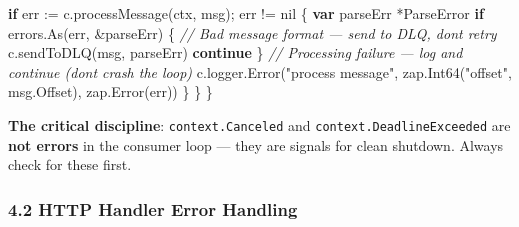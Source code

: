 \documentclass[
]{article}
\newenvironment{Shaded}{}{}
\newcommand{\CommentTok}[1]{\textcolor[rgb]{0.38,0.63,0.69}{\textit{#1}}}
\newcommand{\ControlFlowTok}[1]{\textcolor[rgb]{0.00,0.44,0.13}{\textbf{#1}}}
\newcommand{\KeywordTok}[1]{\textcolor[rgb]{0.00,0.44,0.13}{\textbf{#1}}}
\newcommand{\NormalTok}[1]{#1}
\newcommand{\OperatorTok}[1]{\textcolor[rgb]{0.40,0.40,0.40}{#1}}
\newcommand{\OtherTok}[1]{\textcolor[rgb]{0.00,0.44,0.13}{#1}}
\newcommand{\StringTok}[1]{\textcolor[rgb]{0.25,0.44,0.63}{#1}}
\begin{document}
\begin{Shaded}
\begin{Highlighting}[]
        \ControlFlowTok{if}\NormalTok{ err }\OperatorTok{:=}\NormalTok{ c}\OperatorTok{.}\NormalTok{processMessage}\OperatorTok{(}\NormalTok{ctx}\OperatorTok{,}\NormalTok{ msg}\OperatorTok{);}\NormalTok{ err }\OperatorTok{!=} \OtherTok{nil} \OperatorTok{\{}
            \KeywordTok{var}\NormalTok{ parseErr }\OperatorTok{*}\NormalTok{ParseError}
            \ControlFlowTok{if}\NormalTok{ errors}\OperatorTok{.}\NormalTok{As}\OperatorTok{(}\NormalTok{err}\OperatorTok{,} \OperatorTok{\&}\NormalTok{parseErr}\OperatorTok{)} \OperatorTok{\{}
                \CommentTok{// Bad message format — send to DLQ, don\textquotesingle{}t retry}
\NormalTok{                c}\OperatorTok{.}\NormalTok{sendToDLQ}\OperatorTok{(}\NormalTok{msg}\OperatorTok{,}\NormalTok{ parseErr}\OperatorTok{)}
                \ControlFlowTok{continue}
            \OperatorTok{\}}
            \CommentTok{// Processing failure — log and continue (don\textquotesingle{}t crash the loop)}
\NormalTok{            c}\OperatorTok{.}\NormalTok{logger}\OperatorTok{.}\NormalTok{Error}\OperatorTok{(}\StringTok{"process message"}\OperatorTok{,}\NormalTok{ zap}\OperatorTok{.}\NormalTok{Int64}\OperatorTok{(}\StringTok{"offset"}\OperatorTok{,}\NormalTok{ msg}\OperatorTok{.}\NormalTok{Offset}\OperatorTok{),}\NormalTok{ zap}\OperatorTok{.}\NormalTok{Error}\OperatorTok{(}\NormalTok{err}\OperatorTok{))}
        \OperatorTok{\}}
    \OperatorTok{\}}
\OperatorTok{\}}
\end{Highlighting}
\end{Shaded}

\textbf{The critical discipline}: \texttt{context.Canceled} and
\texttt{context.DeadlineExceeded} are \textbf{not errors} in the
consumer loop --- they are signals for clean shutdown. Always check for
these first.

\hypertarget{http-handler-error-handling}{%
\subsubsection{4.2 HTTP Handler Error
Handling}\label{http-handler-error-handling}}
\end{document}

